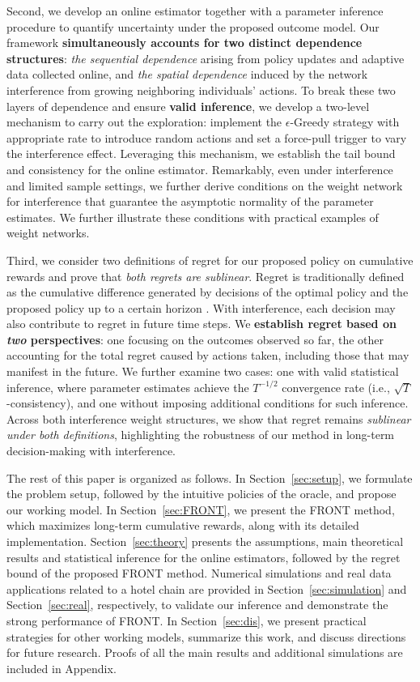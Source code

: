 \documentclass[12pt]{article}
\begin{document}
{Second}, we develop an online estimator together with a parameter inference procedure to quantify uncertainty under the proposed outcome model.
Our framework \textbf{simultaneously accounts for two distinct dependence structures}: \textit{the sequential dependence} arising from policy updates and adaptive data collected online, and \textit{the spatial dependence} induced by the network interference from growing neighboring individuals' actions. To break these two layers of dependence and ensure \textbf{valid inference}, we develop a two-level mechanism to carry out the exploration: implement the $\epsilon$-Greedy strategy with appropriate rate to introduce random actions and set a force-pull trigger to vary the interference effect. Leveraging this mechanism, we establish the tail bound and consistency for the online estimator. Remarkably, even under interference and limited sample settings, we further derive conditions on the weight network for interference that guarantee the asymptotic normality of the parameter estimates. We further illustrate these conditions with practical examples of weight networks.

{Third}, we consider two definitions of regret for our proposed policy on cumulative rewards and prove that \textit{both regrets are sublinear}. Regret is traditionally defined as the cumulative difference generated by decisions of the optimal policy and the proposed policy up to a certain horizon \citep{chen2021}. With interference, each decision may also contribute to regret in future time steps. We  \textbf{establish regret based on \textit{two} perspectives}: one focusing on the outcomes observed so far, the other accounting for the total regret caused by actions taken, including those that may manifest in the future. We further examine two cases: one with valid statistical inference, where parameter estimates achieve the $T^{-1/2}$ convergence rate (i.e., $\sqrt{T}$-consistency), and one without imposing additional conditions for such inference. Across both interference weight structures, we show that regret remains \textit{sublinear under both definitions}, highlighting the robustness of our method in long-term decision-making with interference.

The rest of this paper is organized as follows. In Section~\ref{sec:setup}, we formulate the problem setup, followed by the intuitive policies of the oracle, and propose our working model. In Section~\ref{sec:FRONT}, we present the FRONT method, which maximizes long-term cumulative rewards, along with its detailed implementation. Section~\ref{sec:theory} presents the assumptions, main theoretical results and statistical inference for the online estimators, followed by the regret bound of the proposed FRONT method. Numerical simulations and real data applications related to a hotel chain are provided in Section~\ref{sec:simulation} and Section~\ref{sec:real}, respectively, to validate our inference and demonstrate the strong performance of FRONT. In Section~\ref{sec:dis}, we present practical strategies for other working models, summarize this work, and discuss directions for future research. Proofs of all the main results and additional simulations are included in Appendix.
\end{document}
